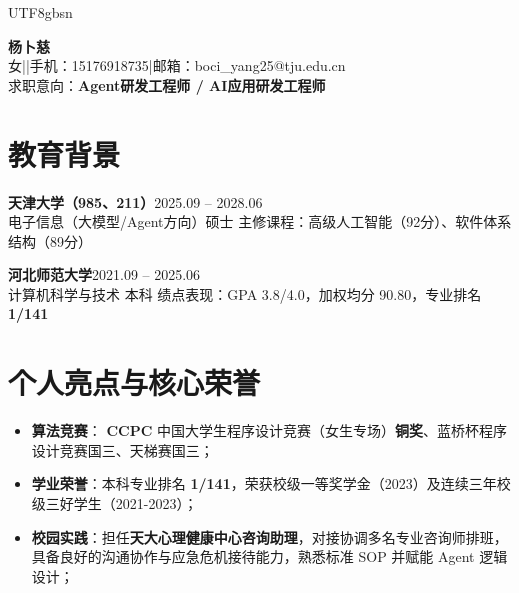 \documentclass[11pt,a4paper]{article}
\begin{document}
\begin{CJK}{UTF8}{gbsn}

\noindent
\begin{minipage}[t]{0.75\textwidth}
\vspace{4pt}
{\LARGE\bfseries 杨卜慈} \\[4pt]
女\enspace|\enspace|\enspace 手机：15176918735\enspace|\enspace 邮箱：boci\_yang25@tju.edu.cn \\[2pt]
求职意向：\textbf{Agent研发工程师 / AI应用研发工程师}
\end{minipage}%
\begin{minipage}[t]{0.25\textwidth}
\vspace{-4pt}
\raggedleft
\framebox[2.2cm]{\rule{0pt}{2.8cm}}
\end{minipage}

\vspace{-4pt}

\section{教育背景}
\textbf{天津大学（985、211）}\hfill 2025.09 -- 2028.06 \\
电子信息（大模型/Agent方向）硕士 \hfill 主修课程：高级人工智能（92分）、软件体系结构（89分）

\vspace{2pt}
\textbf{河北师范大学}\hfill 2021.09 -- 2025.06 \\
计算机科学与技术 本科 \hfill 绩点表现：GPA 3.8/4.0，加权均分 90.80，专业排名 \textbf{1/141} 

\section{个人亮点与核心荣誉}
\begin{itemize}
\item \textbf{算法竞赛}： \textbf{CCPC} 中国大学生程序设计竞赛（女生专场）\textbf{铜奖}、蓝桥杯程序设计竞赛国三、天梯赛国三；
\item \textbf{学业荣誉}：本科专业排名 \textbf{1/141}，荣获校级一等奖学金（2023）及连续三年校级三好学生（2021-2023）；
\item \textbf{校园实践}：担任\textbf{天大心理健康中心咨询助理}，对接协调多名专业咨询师排班，具备良好的沟通协作与应急危机接待能力，熟悉标准 SOP 并赋能 Agent 逻辑设计；
\end{itemize}


\end{CJK}
\end{document}
